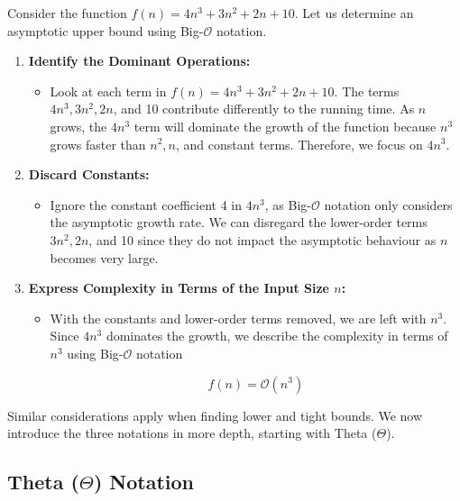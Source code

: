 \begin{example}

Consider the function $f(n)=4 n^3+3 n^2+2 n+10$. Let us determine an asymptotic upper bound using Big-$\mathcal{O}$ notation.
    \begin{enumerate}
        \item \textbf{Identify the Dominant Operations:}
        \begin{itemize}
            \item Look at each term in $f(n)=4 n^3+3 n^2+2 n+10$.
            The terms $4 n^3, 3 n^2, 2 n$, and 10 contribute differently to the running time.
            As $n$ grows, the $4 n^3$ term will dominate the growth of the function because $n^3$ grows faster than $n^2, n$, and constant terms. Therefore, we focus on $4 n^3$.
        \end{itemize}
        \item \textbf{Discard Constants:}
        \begin{itemize}
            \item Ignore the constant coefficient 4 in $4 n^3$, as Big-$\mathcal{O}$ notation only considers the asymptotic growth rate.
            We can disregard the lower-order terms $3 n^2, 2 n$, and 10 since they do not impact the asymptotic behaviour as $n$ becomes very large.
        \end{itemize}
        \item \textbf{Express Complexity in Terms of the Input Size $n$:}
        \begin{itemize}
            \item With the constants and lower-order terms removed, we are left with $n^3$.
            Since $4 n^3$ dominates the growth, we describe the complexity in terms of $n^3$ using Big-$\mathcal{O}$ notation

            \[
                f(n)=\mathcal{O}\left(n^3\right)
            \]
        \end{itemize}
    \end{enumerate}
\end{example}

Similar considerations apply when finding lower and tight bounds. We now introduce the three notations in more depth, starting with Theta ($\Theta$).

\subsection*{Theta (\texorpdfstring{$\Theta$}{Theta}) Notation}

